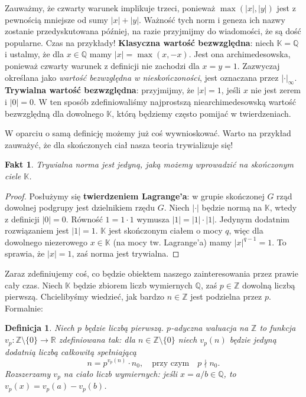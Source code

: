 \documentclass[a4paper,fleqn,9pt]{extarticle}
\newtheorem{fkt}{Fakt}
\newtheorem{dff}{Definicja}
\begin{document}
Zauważmy, że czwarty warunek implikuje trzeci, ponieważ $\max(|x|,|y|)$ jest z pewnością mniejsze od sumy $|x| + |y|$.
Ważność tych norm i geneza ich nazwy zostanie przedyskutowana później, na razie przyjmijmy do wiadomości, że są dość popularne. 
Czas na przykłady!
\textbf{Klasyczna wartość bezwzględna}: niech $\mathbb K = \mathbb Q$ i ustalmy, że dla $x\in\mathbb Q$ mamy $|x| = \max(x,-x)$. Jest ona archimedesowska, ponieważ czwarty warunek z definicji nie zachodzi dla $x = y = 1$.
Zazwyczaj określana jako \emph{wartość bezwzględna w nieskończoności}, jest oznaczana przez $|\cdot|_\infty$.
\textbf{Trywialna wartość bezwzględna}: przyjmijmy, że $|x| = 1$, jeśli $x$ nie jest zerem i $|0| = 0$.
W ten sposób zdefiniowaliśmy najprostszą niearchimedesowską wartość bezwzględną dla dowolnego $\mathbb K$, którą będziemy często pomijać w twierdzeniach.

W oparciu o samą definicję możemy już coś wywnioskować.
Warto na przykład zauważyć, że dla skończonych ciał nasza teoria trywializuje się! 

\begin{fkt}
Trywialna norma jest jedyną, jaką możemy wprowadzić na skończonym ciele $\mathbb K$.
\end{fkt}

\begin{proof}
Posłużymy się \textbf{twierdzeniem Lagrange'a}: w grupie skończonej $G$ rząd dowolnej podgrupy jest dzielnikiem rzędu $G$.
Niech $|\cdot|$ będzie normą na $\mathbb K$, wtedy z definicji $|0| = 0$. Równość $1 = 1 \cdot 1$ wymusza $|1| = |1| \cdot |1|$. Jedynym dodatnim rozwiązaniem jest $|1| = 1$. $\mathbb K$ jest skończonym ciałem o mocy $q$, więc dla dowolnego niezerowego $x\in\mathbb K$ (na mocy tw. Lagrange'a) mamy $|x|^{q-1} = 1$. To sprawia, że $|x| = 1$, zaś norma jest trywialna. \end{proof}
 
 Zaraz zdefiniujemy coś, co będzie obiektem naszego zainteresowania przez prawie cały czas. Niech $\mathbb K$ będzie zbiorem liczb wymiernych $\mathbb Q$, zaś $p\in\mathbb Z$ dowolną liczbą pierwszą. Chcielibyśmy wiedzieć, jak bardzo $n\in\mathbb Z$ jest podzielna przez $p$. Formalnie:

\begin{dff}Niech $p$ będzie liczbą pierwszą. $p$-adyczna waluacja na $\mathbb Z$ to funkcja $v_p:\mathbb Z\setminus\{0\} \rightarrow \mathbb R$ zdefiniowana tak: dla $n\in\mathbb Z\setminus\{0\}$ niech $v_p(n)$ będzie jedyną dodatnią liczbą całkowitą spełniającą \begin{equation*}n = p^{v_p(n)} \cdot n_0, \quad \text {przy czym} \quad p\nmid n_0.\end{equation*} Rozszerzamy $v_p$ na ciało liczb wymiernych: jeśli $x = a/b \in\mathbb Q$, to $v_p(x) = v_p(a) - v_p(b)$.\end{dff}
\end{document}
